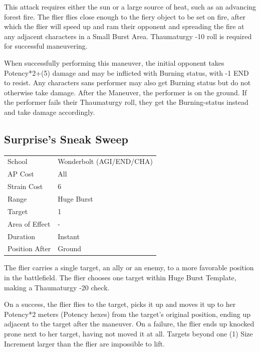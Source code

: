 \documentclass[11pt,a4paper,twocolumn]{book}
\begin{document}
\medskip

This attack requires either the sun or a large source of heat, such as an advancing forest fire. The flier flies close enough to the fiery object to be set on fire, after which the flier will speed up and ram their opponent and spreading the fire at any adjacent characters in a Small Burst Area. Thaumaturgy -10 roll is required for successful maneuvering.

When successfully performing this maneuver, the initial opponent takes Potency*2+(5) damage and may be inflicted with Burning status, with -1 END to resist. Any characters sans performer may also get Burning status but do not otherwise take damage. After the Maneuver, the performer is on the ground. If the performer fails their Thaumaturgy roll, they get the Burning-status instead and take damage accordingly.

\vfill

\subsection*{Surprise's Sneak Sweep}
{
	\begin{tabu} to 75mm{| X[l,4] | X[l,7] |}
		\hline
		School 			& Wonderbolt (AGI/END/CHA)		\\
        AP Cost	      	& All 				\\
        Strain Cost     & 6 				\\
        Range     		& Huge Burst		\\
        Target      	& 1 				\\
        Area of Effect  & - 	 			\\
        Duration     	& Instant 	 		\\
		Position After  & Ground 			\\ \hline
	\end{tabu}
		
}

\medskip

The flier carries a single target, an ally or an enemy, to a more favorable position in the battlefield. The flier chooses one target within Huge Burst Template, making a Thaumaturgy -20 check.

On a success, the flier flies to the target, picks it up and moves it up to her Potency*2 meters (Potency hexes) from the target's original position, ending up adjacent to the target after the maneuver. On a failure, the flier ends up knocked prone next to her target, having not moved it at all. Targets beyond one (1) Size Increment larger than the flier are impossible to lift.
\end{document}
